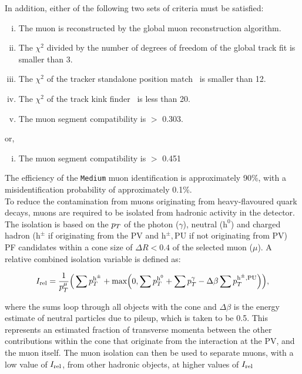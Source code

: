 In addition, either of the following two sets of criteria must be satisfied:

\begin{enumerate}[i)]
\item The muon is reconstructed by the global muon reconstruction algorithm.
\item The $\chi^2$ divided by the number of degrees of freedom of the global track fit is smaller than 3.
\item The $\chi^2$ of the tracker standalone position match~\cite{CMS:2009fdy} is smaller than 12.
\item The $\chi^2$ of the track kink finder~\cite{CMS:2018rym} is less than 20.
\item The muon segment compatibility is $>$ 0.303.
\end{enumerate}

or,

\begin{enumerate}[i)]
\item The muon segment compatibility is $>$ 0.451 
\end{enumerate}

The efficiency of the \texttt{Medium} muon identification is approximately 90\%, with a misidentification probability of approximately 0.1\%. \\

To reduce the contamination from muons originating from heavy-flavoured quark decays, muons are required to be isolated from hadronic activity in the detector. 
The isolation is based on the $p_{T}$ of the photon ($\gamma$), neutral ($\text{h}^0$) and charged hadron ($\text{h}^{\pm}$ if originating from the \ac{PV} and $\text{h}^{\pm}, \text{PU}$ if not originating from \ac{PV}) \ac{PF} candidates within a cone size of $\Delta R<0.4$ of the selected muon ($\mu$). 
A relative combined isolation variable is defined as:

\begin{equation}
\label{eqn:reliso}
I_{\text{rel}} = \frac{1}{p_{T}^{\mu}} \Big( \sum p_{T}^{\text{h}^{\pm}} + \text{max}\Big( 0, \sum p_{T}^{\text{h}^0} + \sum p_{T}^{\gamma} - \Delta \beta \sum p_{T}^{\text{h}^{\pm}, \text{PU}} \Big) \Big),
\end{equation}

where the sums loop through all objects with the cone and $\Delta \beta$ is the energy estimate of neutral particles due to pileup, which is taken to be 0.5.
This represents an estimated fraction of transverse momenta between the other contributions within the cone that originate from the interaction at the \ac{PV}, and the muon itself.
The muon isolation can then be used to separate muons, with a low value of $I_{\text{rel}}$, from other hadronic objects, at higher values of $I_{\text{rel}}$

